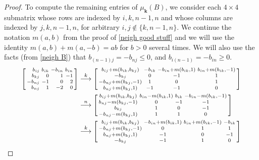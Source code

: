 \documentclass{amsart}
\theoremstyle{definition}
\theoremstyle{remark}
\numberwithin{equation}{section}
\newcommand{\sgn}{\operatorname{sgn}}
\newcommand{\set}[1]{{\lbrace #1 \rbrace}}
\newcommand{\0}{{\mathbf{0}}}
\newcommand{\kk}{\mathbf{k}}
\begin{document}
\begin{proof}
To compute the remaining entries of $\mu_\kk(B)$, we consider each $4\times4$ submatrix whose rows are indexed by $i,k,n-1,n$ and whose columns are indexed by $j,k,n-1,n$, for arbitrary $i,j\not\in\set{k,n-1,n}$.
We continue the notation $m(a,b)$ from the proof of \cref{neigh good stuff} and we will use the identity $m(a,b)+m(a,-b)=ab$ for $b>0$ several times.
We will also use the facts (from \cref{neigh B}) that $b_{(n-1)j}=-b_{nj}\le0$, and $b_{i(n-1)}=-b_{in}\ge0$.
\begin{align*}
\begin{bsmallmatrix*}[r]
b_{ij}&b_{ik}&-b_{in}&b_{in}\\
b_{kj}&0&1&-1\\
-b_{nj}&-1&0&2\\
b_{nj}&1&-2&0
\end{bsmallmatrix*}
&\overset{k}{\longrightarrow}
\begin{bsmallmatrix*}
b_{ij}+m(b_{ik},b_{kj}) & -b_{ik} & -b_{in}+m(b_{ik},1) & b_{in}+m(b_{ik},-1)\\
-b_{kj} & 0 & -1 & 1\\
-b_{nj}+m(b_{kj},-1) & 1 & 0 & 1\\
b_{nj}+m(b_{kj},1) & -1 & -1 & 0
\end{bsmallmatrix*}\\
&\overset{n}{\longrightarrow}
\begin{bsmallmatrix*}
b_{ij}+m(b_{ik},b_{kj}) & b_{in}-m(b_{ik},1) & b_{ik} & -b_{in}-m(b_{ik},-1)\\
b_{nj}-m(b_{kj},-1) & 0 & -1 & -1\\
b_{kj} & 1 & 0 & -1\\
-b_{nj}-m(b_{kj},1) & 1 & 1 & 0
\end{bsmallmatrix*}\\
&\overset{k}{\longrightarrow}
\begin{bsmallmatrix*}
b_{ij}+m(b_{ik},b_{kj}) & -b_{in}+m(b_{ik},1) & b_{in}+m(b_{ik},-1) & -b_{ik}\\
-b_{nj}+m(b_{kj},-1) & 0 & 1 & 1\\
b_{nj}+m(b_{kj},1)  & -1 & 0 & -1\\
-b_{kj}& -1 & 1 & 0
\end{bsmallmatrix*}\\

\end{align*}
\end{proof}
\end{document}
